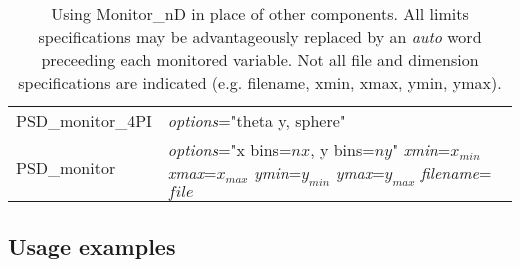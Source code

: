 \begin{table}
\begin{center}
{\begin{tabular}{|p{}|p{}|}
        PSD\_monitor\_4PI    & \textit{options}="theta y, sphere" \\
        PSD\_monitor        & \textit{options}="x bins=$nx$, y bins=$ny$" \textit{xmin}=$x_{min}$ \textit{xmax}=$x_{max}$ \textit{ymin}=$y_{min}$ \textit{ymax}=$y_{max}$ \textit{filename}=$file$\\
        \hline
    \end{tabular}
    \caption{Using Monitor\_nD in place of other components. All limits specifications may be advantageously replaced by an \textit{auto} word preceeding each monitored variable. Not all file and dimension specifications are indicated (e.g. filename, xmin, xmax, ymin, ymax).}
    \label{t:monitor-nd-equiv}
    }
  \end{center}
\end{table}

\subsection{Usage examples}

